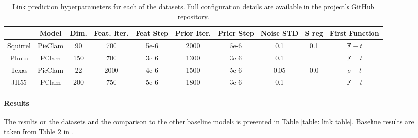 \documentclass{article}
\theoremstyle{plain}
\theoremstyle{definition}
\theoremstyle{remark}
\begin{document}
\begin{table}[t]
    \centering
    \begin{tabular}{|c|c|c|c|c|c|c|c|c|c|}
        \hline
        &Model  & Dim. & Feat. Iter.  & Feat Step &Prior Iter. & Prior Step &Noise STD &S reg &First Function\\
        \hline
        Squirrel &  PieClam   &     90 &   700& 5e-6  & 2000 & 5e-6 &  0.1  & 0.1 & $\mathbf{F} - t$   \\
        Photo    &  PClam     & 150    &  700 & 3e-6  & 1300  & 3e-6&  0.1 & - & $\mathbf{F} - t$ \\
        Texas    &   PieClam  &  22    &  2000& 4e-6  &   1500 & 5e-6& 0.05 &  0.0& $p - t$       \\
        JH55     &   PClam    &   200 & 750 &  5e-6  &  1800   & 3e-6&  0.1 & - &$\mathbf{F} - t$\\
        
        \hline
    \end{tabular}
    \caption{Link prediction hyperparameters for each of the datasets. Full configuration details are available in the project's GitHub repository.}
    \label{table: link hypers table}
\end{table}




\paragraph{Results}
The results on the datasets and the comparison to the other baseline models is presented in Table \ref{table: link table}. Baseline results are taken from Table $2$ in \cite{zhou2022disenlink}.

\end{document}
